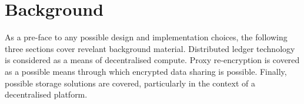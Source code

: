 \section{Background}

As a pre-face to any possible design and implementation choices, the following three sections cover revelant background material. Distributed ledger technology is considered as a means of decentralised compute. Proxy re-encryption is covered as a possible means through which encrypted data sharing is possible. Finally, possible storage solutions are covered, particularly in the context of a decentralised platform.






